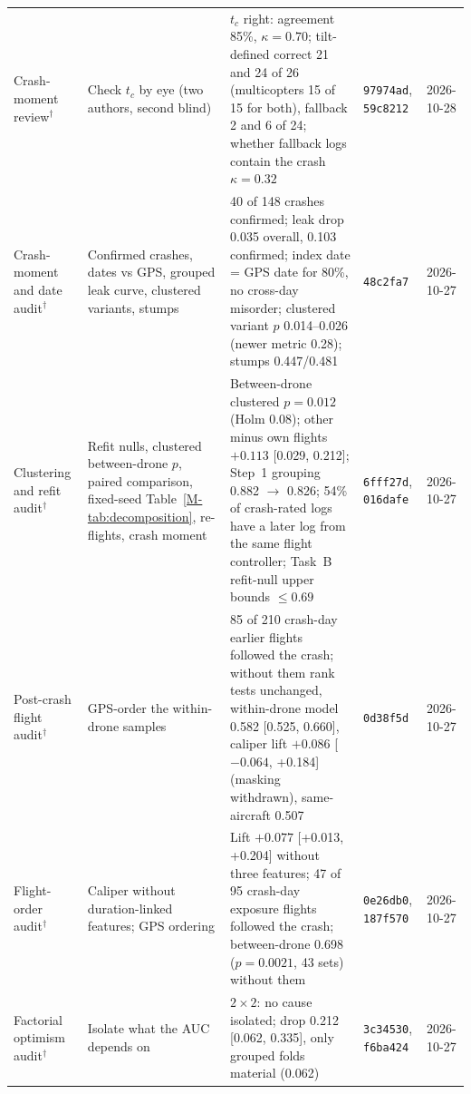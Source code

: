 \documentclass[preprint,12pt]{elsarticle}
\begin{document}
{\begin{longtable}{@{}p{}p{}p{}p{}p{}@{}}
Crash-moment review$^\dagger$ & Check $t_c$ by eye (two authors, second blind) & $t_c$ right: agreement 85\%, $\kappa=0.70$; tilt-defined correct 21 and 24 of 26 (multicopters 15 of 15 for both), fallback 2 and 6 of 24; whether fallback logs contain the crash $\kappa=0.32$ & \texttt{97974ad}, \texttt{59c8212} & 2026-10-28 \\
Crash-moment and date audit$^\dagger$ & Confirmed crashes, dates vs GPS, grouped leak curve, clustered variants, stumps & 40 of 148 crashes confirmed; leak drop 0.035 overall, 0.103 confirmed; index date = GPS date for 80\%, no cross-day misorder; clustered variant $p$ 0.014--0.026 (newer metric 0.28); stumps 0.447/0.481 & \texttt{48c2fa7} & 2026-10-27 \\
Clustering and refit audit$^\dagger$ & Refit nulls, clustered between-drone $p$, paired comparison, fixed-seed Table~\ref{M-tab:decomposition}, re-flights, crash moment & Between-drone clustered $p=0.012$ (Holm 0.08); other minus own flights $+0.113$ [0.029, 0.212]; Step~1 grouping 0.882 $\to$ 0.826; 54\% of crash-rated logs have a later log from the same flight controller; Task~B refit-null upper bounds $\le 0.69$ & \texttt{6fff27d}, \texttt{016dafe} & 2026-10-27 \\
Post-crash flight audit$^\dagger$ & GPS-order the within-drone samples & 85 of 210 crash-day earlier flights followed the crash; without them rank tests unchanged, within-drone model 0.582 [0.525, 0.660], caliper lift $+0.086$ [$-0.064$, +0.184] (masking withdrawn), same-aircraft 0.507 & \texttt{0d38f5d} & 2026-10-27 \\
Flight-order audit$^\dagger$ & Caliper without duration-linked features; GPS ordering & Lift $+0.077$ [+0.013, +0.204] without three features; 47 of 95 crash-day exposure flights followed the crash; between-drone 0.698 ($p=0.0021$, 43 sets) without them & \texttt{0e26db0}, \texttt{187f570} & 2026-10-27 \\
Factorial optimism audit$^\dagger$ & Isolate what the AUC depends on & $2\times2$: no cause isolated; drop 0.212 [0.062, 0.335], only grouped folds material (0.062) & \texttt{3c34530}, \texttt{f6ba424} & 2026-10-27 \\
\bottomrule
\end{longtable}}


\FloatBarrier



\end{document}
